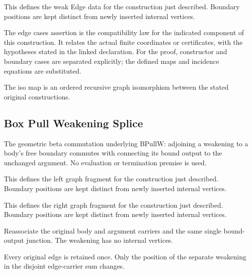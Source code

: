 This defines the weak Edge data for the construction just described. Boundary positions are kept distinct from newly inserted internal vertices.
\par{}

The edge cases assertion is the compatibility law for the indicated component of this construction. It relates the actual finite coordinates or certificates, with the hypotheses stated in the linked declaration.
For the proof, constructor and boundary cases are separated explicitly; the defined maps and incidence equations are substituted.
\par{}

The iso map is an ordered recursive graph isomorphism between the stated original constructions.
\par{}

\subsection{Box Pull Weakening Splice}
The geometric beta commutation underlying BPullW: adjoining a weakening to a body's free boundary commutes with connecting its bound output to the unchanged argument. No evaluation or termination premise is used.

This defines the left graph fragment for the construction just described. Boundary positions are kept distinct from newly inserted internal vertices.
\par{}

This defines the right graph fragment for the construction just described. Boundary positions are kept distinct from newly inserted internal vertices.
\par{}

Reassociate the original body and argument carriers and the same single bound-output junction. The weakening has no internal vertices.
\par{}

Every original edge is retained once. Only the position of the separate weakening in the disjoint edge-carrier sum changes.
\par{}

